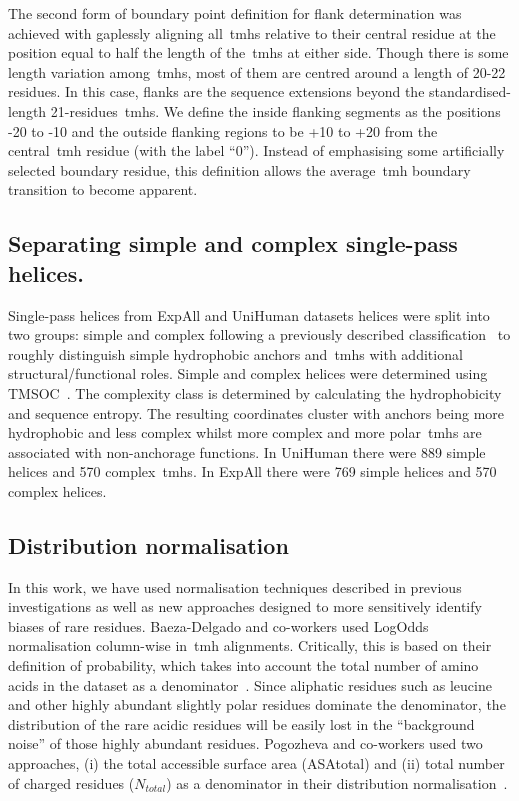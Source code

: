 The second form of boundary point definition for flank determination was achieved with gaplessly aligning all~\gls{tmh}s relative to their central residue at the position equal to half the length of the~\gls{tmh}s at either side.
Though there is some length variation among~\gls{tmh}s, most of them are centred around a length of 20-22 residues.
In this case, flanks are the sequence extensions beyond the standardised-length 21-residues~\gls{tmh}s.
We define the inside flanking segments as the positions -20 to -10 and the outside flanking regions to be +10 to +20 from the central~\gls{tmh} residue (with the label ``0'').
Instead of emphasising some artificially selected boundary residue, this definition allows the average~\gls{tmh} boundary transition to become apparent.

\subsection{Separating simple and complex single-pass helices.}

Single-pass helices from ExpAll and UniHuman datasets helices were split into two groups: simple and complex following a previously described classification~\cite{Wong2011,Wong2012} to roughly distinguish simple hydrophobic anchors and~\gls{tmh}s with additional structural/functional roles.
Simple and complex helices were determined using TMSOC~\cite{Wong2012}.
The complexity class is determined by calculating the hydrophobicity and sequence entropy.
The resulting coordinates cluster with anchors being more hydrophobic and less complex whilst more complex and more polar~\gls{tmh}s are associated with non-anchorage functions.
In UniHuman there were 889 simple helices and 570 complex~\gls{tmh}s.
In ExpAll there were 769 simple helices and 570 complex helices.

\subsection{Distribution normalisation}

In this work, we have used normalisation techniques described in previous investigations as well as new approaches designed to more sensitively identify biases of rare residues.
Baeza-Delgado and co-workers used LogOdds normalisation column-wise in~\gls{tmh} alignments.
Critically, this is based on their definition of probability, which takes into account the total number of amino acids in the dataset as a denominator~\cite{Baeza-Delgado2013}.
Since aliphatic residues such as leucine and other highly abundant slightly polar residues dominate the denominator, the distribution of the rare acidic residues will be easily lost in the ``background noise'' of those highly abundant residues.
Pogozheva and co-workers used two approaches, (i) the total accessible surface area (ASAtotal) and (ii) total number of charged residues (${N}_{total}$) as a denominator in their distribution normalisation~\cite{Pogozheva2013}.

